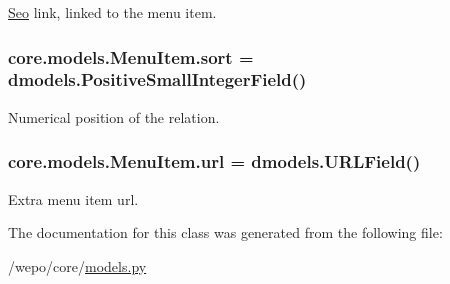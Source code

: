 \hyperlink{classcore_1_1models_1_1Seo}{Seo} link, linked to the menu item. 

\hypertarget{classcore_1_1models_1_1MenuItem_a82ed62dbf13487126c5bc1f458c4b67c}{
\subsubsection[{sort}]{\setlength{\rightskip}{0pt plus 5cm}core.\-models.\-Menu\-Item.\-sort = dmodels.\-Positive\-Small\-Integer\-Field()\hspace{0.3cm}{\ttfamily [static]}}}\label{classcore_1_1models_1_1MenuItem_a82ed62dbf13487126c5bc1f458c4b67c}


Numerical position of the relation. 

\hypertarget{classcore_1_1models_1_1MenuItem_a05a0b2b1302e5a8e224ae29a4edbe93b}{
\subsubsection[{url}]{\setlength{\rightskip}{0pt plus 5cm}core.\-models.\-Menu\-Item.\-url = dmodels.\-U\-R\-L\-Field()\hspace{0.3cm}{\ttfamily [static]}}}\label{classcore_1_1models_1_1MenuItem_a05a0b2b1302e5a8e224ae29a4edbe93b}


Extra menu item url. 



The documentation for this class was generated from the following file\-:\begin{DoxyCompactItemize}
\item 
/wepo/core/\hyperlink{models_8py}{models.\-py}\end{DoxyCompactItemize}
